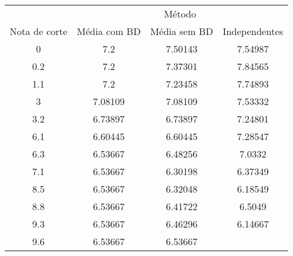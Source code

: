 \begin{tabular}{c ccc}
        \hline
                      & \multicolumn{3}{c}{Método} \\ \cline{2-4}
        Nota de corte & Média com BD & Média sem BD & Independentes \\
        \hline
        0    & 7.2     & 7.50143  & 7.54987 \\
        0.2  & 7.2     & 7.37301  & 7.84565 \\
        1.1  & 7.2     & 7.23458 & 7.74893  \\
        3    & 7.08109 & 7.08109 & 7.53332  \\
        3.2  & 6.73897 & 6.73897 & 7.24801  \\
        6.1  & 6.60445 & 6.60445 & 7.28547  \\
        6.3  & 6.53667 & 6.48256 & 7.0332   \\
        7.1  & 6.53667 & 6.30198 & 6.37349  \\
        8.5  & 6.53667 & 6.32048 & 6.18549  \\
        8.8  & 6.53667 & 6.41722 & 6.5049   \\
        9.3  & 6.53667 & 6.46296 & 6.14667  \\
        9.6  & 6.53667 & 6.53667 &          \\
        \hline
\end{tabular}
